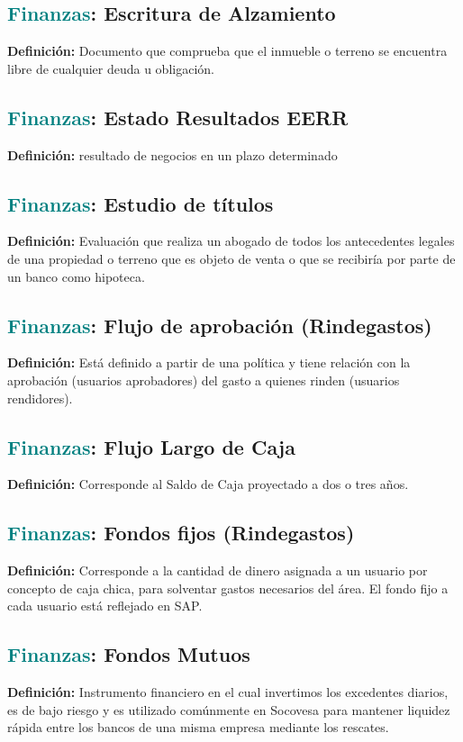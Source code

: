\documentclass[12pt]{article}
\begin{document}
\subsection{\textcolor{teal}{Finanzas}: Escritura de Alzamiento}
\textbf{Definición:} Documento que comprueba que el inmueble o terreno se encuentra libre de cualquier deuda u obligación.
\subsection{\textcolor{teal}{Finanzas}: Estado Resultados  EERR}
\textbf{Definición:} resultado de negocios en un plazo determinado
\subsection{\textcolor{teal}{Finanzas}: Estudio de títulos}
\textbf{Definición:} Evaluación que realiza un abogado de todos los antecedentes legales de una propiedad o terreno que es objeto de venta o que se recibiría por parte de un banco como hipoteca.
\subsection{\textcolor{teal}{Finanzas}: Flujo de aprobación (Rindegastos)}
\textbf{Definición:} Está definido a partir de una política y tiene relación con la aprobación (usuarios aprobadores) del gasto a quienes rinden (usuarios rendidores).
\subsection{\textcolor{teal}{Finanzas}: Flujo Largo de Caja}
\textbf{Definición:} Corresponde al Saldo de Caja proyectado a dos o tres años.
\subsection{\textcolor{teal}{Finanzas}: Fondos fijos (Rindegastos)}
\textbf{Definición:} Corresponde a la cantidad de dinero asignada a un usuario por concepto de caja chica, para solventar gastos necesarios del área. El fondo fijo a cada usuario está reflejado en SAP.
\subsection{\textcolor{teal}{Finanzas}: Fondos Mutuos}
\textbf{Definición:} Instrumento financiero en el cual invertimos los excedentes diarios, es de bajo riesgo y es utilizado comúnmente en Socovesa para mantener liquidez rápida entre los bancos de una misma empresa mediante los rescates.
\end{document}
